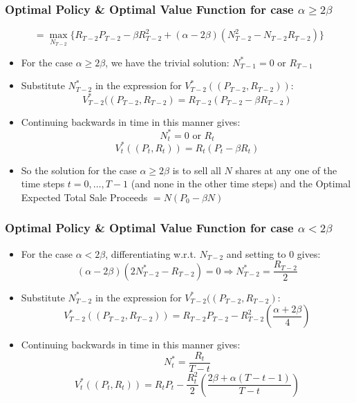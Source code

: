 \documentclass[handout]{beamer}
\begin{document}
\begin{frame}
\frametitle{Optimal Policy \& Optimal Value Function for case $\alpha \geq 2\beta$}
\pause
$$=\max_{N_{T-2}} \{ R_{T-2} P_{T-2} - \beta R_{T-2}^2 + (\alpha - 2 \beta) (N_{T-2}^2 - N_{T-2}R_{T-2}) \}$$
\pause
\begin{itemize}[<+->]
\item For the case $\alpha \geq 2\beta$, we have the trivial solution: $N^*_{T-1} = 0$ or $R_{T-1}$
\item Substitute $N^*_{T-2}$ in the expression for $V^*_{T-2}((P_{T-2},R_{T-2}))$:
$$V^*_{T-2}((P_{T-2},R_{T-2}) =  R_{T-2} (P_{T-2} - \beta R_{T-2})$$
\item Continuing backwards in time in this manner gives:
$$N^*_t = 0 \mbox{ or } {R_t}$$
$$V^*_t((P_t,R_t)) = R_t (P_t - \beta R_t)$$
\item So the solution for the case $\alpha \geq 2\beta$ is to sell all $N$ shares at any one of the time steps $t = 0, \ldots, T-1$ (and none in the other time steps) and the Optimal Expected Total Sale Proceeds $ = N(P_0 - \beta N)$
\end{itemize}
\end{frame}

\begin{frame}
\frametitle{Optimal Policy \& Optimal Value Function for case $\alpha < 2\beta$}
\pause
\begin{itemize}[<+->]
\item For the case $\alpha < 2\beta$, differentiating w.r.t. $N_{T-2}$ and setting to 0 gives:
$$(\alpha - 2\beta)(2N^*_{T-2} - R_{T-2}) = 0 \Rightarrow N^*_{T-2} = \frac {R_{T-2}} 2$$
\item Substitute $N^*_{T-2}$ in the expression for $V^*_{T-2}((P_{T-2},R_{T-2})$:
$$V^*_{T-2}((P_{T-2},R_{T-2})) =  R_{T-2} P_{T-2} - R_{T-2}^2 (\frac {\alpha + 2\beta} 4)$$
\item Continuing backwards in time in this manner gives:
$$N^*_t = \frac {R_t} {T-t}$$
$$V^*_t((P_t,R_t)) = R_t P_t - \frac {R_t^2} 2 (\frac {2\beta + \alpha (T-t-1)} {T-t})$$
\end{itemize}
\end{frame}
\end{document}
